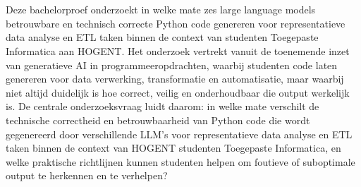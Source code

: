 
%
%
%
%
%

%



\chapter*{}



Deze bachelorproef onderzoekt in welke mate zes large language models betrouwbare en technisch correcte Python code genereren voor representatieve data analyse en ETL taken binnen de context van studenten Toegepaste Informatica aan HOGENT. Het onderzoek vertrekt vanuit de toenemende inzet van generatieve AI in programmeeropdrachten, waarbij studenten code laten genereren voor data verwerking, transformatie en automatisatie, maar waarbij niet altijd duidelijk is hoe correct, veilig en onderhoudbaar die output werkelijk is. De centrale onderzoeksvraag luidt daarom: in welke mate verschilt de technische correctheid en betrouwbaarheid van Python code die wordt gegenereerd door verschillende LLM's voor representatieve data analyse en ETL taken binnen de context van HOGENT studenten Toegepaste Informatica, en welke praktische richtlijnen kunnen studenten helpen om foutieve of suboptimale output te herkennen en te verhelpen?

